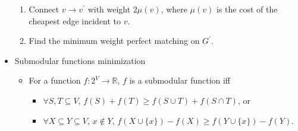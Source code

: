 \begin{itemize}
\begin{enumerate}
      \item Connect $v \to v^\prime$ with weight $2\mu(v)$, where $\mu(v)$ is the cost of the cheapest edge incident to $v$.
      \item Find the minimum weight perfect matching on $G^\prime$.
    \end{enumerate}
    \item Submodular functions minimization
    \vspace{-1em}
    \begin{itemize}
        \item For a function $f: 2^V \to \mathbb{R}$, $f$ is a submodular function iff
            \begin{itemize}
                \item $\forall S,T \subseteq V$, $f(S) + f(T) \geq f(S \cup T) + f(S \cap T)$, or
                \item $\forall X \subseteq Y \subseteq V$, $x\notin Y$, $f(X\cup\{x\})-f(X)\geq f(Y\cup\{x\})-f(Y)$.

\end{itemize}
\end{itemize}
\end{itemize}
